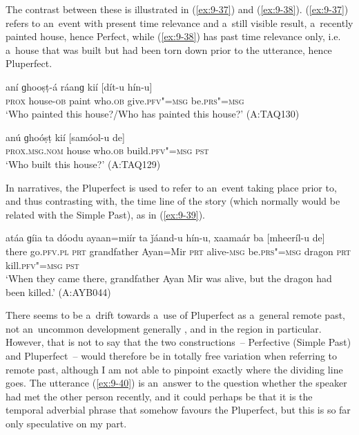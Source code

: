 The contrast between these is illustrated in (\ref{ex:9-37}) and (\ref{ex:9-38}). (\ref{ex:9-37}) refers to an~event with present time relevance and a~still visible result, a~recently painted house, hence Perfect, while (\ref{ex:9-38}) has past time relevance only, i.e. a~house that was built but had been torn down prior to the utterance, hence Pluperfect.

\begin{exe}
\ex
\label{ex:9-37}
\gll aní ɡhooṣṭ-á ráanɡ kií [dít-u hín-u]  \\
\textsc{prox} house-\textsc{ob} paint who.\textsc{ob} give.\textsc{pfv"=msg} be.\textsc{prs"=msg} \\
\glt `Who painted this house?/Who has painted this house?' (A:TAQ130)

\ex
\label{ex:9-38}
\gll anú ɡhoóṣṭ kií [samóol-u de] \\
\textsc{prox.msg.nom} house who.\textsc{ob} build.\textsc{pfv"=msg} \textsc{pst} \\
\glt `Who built this house?' (A:TAQ129)
\end{exe}

In narratives, the Pluperfect is used to refer to an~event taking place prior to, and thus contrasting with, the time line of the story (which normally would be related with the Simple Past), as in (\ref{ex:9-39}).

\begin{exe}
\ex
\label{ex:9-39}
\gll atáa ɡíia ta dóodu ayaan=miír ta ǰáand-u hín-u, xaamaár ba [mheeríl-u de] \\
there go.\textsc{pfv.pl} \textsc{prt} grandfather Ayan=Mir \textsc{prt}  alive-\textsc{msg}
be.\textsc{prs"=msg} dragon \textsc{prt} kill.\textsc{pfv"=msg} \textsc{pst} \\
\glt `When they came there, grandfather Ayan Mir was alive, but the dragon had been killed.' (A:AYB044) 
\end{exe}

There seems to be a~drift towards a~use of Pluperfect as a~general remote past, not an~uncommon development generally \citep[147]{dahl1985}, and in the region in particular. However, that is not to say that the two constructions~-- Perfective (Simple Past) and Pluperfect~-- would therefore be in totally free variation when referring to remote past, although I am not able to pinpoint exactly where the dividing line goes. The utterance (\ref{ex:9-40}) is an~answer to the question whether the speaker had met the other person recently, and it could perhaps be that it is the temporal adverbial phrase that somehow favours the Pluperfect, but this is so far only speculative on my part.

